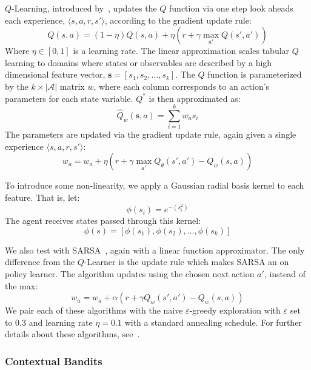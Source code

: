 \documentclass{article}
\newcommand{\mc}{\mathcal}
\begin{document}
{$Q$-Learning, introduced by~\citet{watkins1992q}, updates the $Q$ function via one step look aheads each experience, $\langle s, a, r, s' \rangle$, according to the gradient update rule:
\begin{equation}
Q(s,a) = (1-\eta) Q(s,a) + \eta(r + \gamma \max_{a'} Q(s', a'))
\end{equation}
Where $\eta \in [0,1]$ is a learning rate. The linear approximation scales tabular $Q$ learning to domains where states or observables are described by a high dimensional feature vector, $\bm{s} = [s_1, s_2, \ldots, s_k]$. The $Q$ function is parameterized by the $k \times |\mc{A}|$ matrix $w$, where each column corresponds to an action's parameters for each state variable. $Q^*$ is then approximated as:
\begin{equation}
\hat{Q}_w(\bm{s},a) = \sum_{i=1}^k w_a s_i
\end{equation}
The parameters are updated via the gradient update rule, again given a single experience $\langle s, a, r, s' \rangle$:
\begin{equation}
w_a = w_a + \eta \left( r + \gamma \max_{a'} Q_\theta(s',a') - Q_w(s,a)\right)
\end{equation}

To introduce some non-linearity, we apply a Gaussian radial basis kernel to each feature. That is, let:
\begin{equation}
\phi(s_i) = e^{-(s_i^2)}
\end{equation}
The agent receives states passed through this kernel:
\begin{equation}
\phi(s) = [\phi(s_1), \phi(s_2), \ldots, \phi(s_k)]
\end{equation}

We also test with SARSA~\cite{rummery1994line}, again with a linear function approximator. The only difference from the $Q$-Learner is the update rule which makes SARSA an on policy learner. The algorithm updates using the chosen next action $a'$, instead of the max:
\begin{equation}
w_a = w_a + \alpha \left( r + \gamma Q_w(s',a') - Q_w(s,a)\right)
\end{equation}
We pair each of these algorithms with the naive $\varepsilon$-greedy exploration with $\varepsilon$ set to $0.3$ and learning rate $\eta = 0.1$ with a standard annealing schedule. For further details about these algorithms, see~\citet{geramifard2013tutorial}.

\subsubsection{Contextual Bandits}

}
\end{document}
